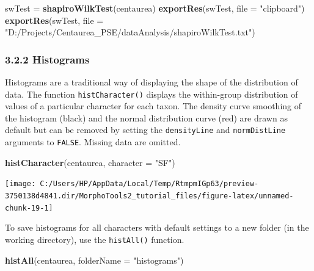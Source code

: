 \documentclass[
]{article}
\newenvironment{Shaded}{\begin{snugshade}}{\end{snugshade}}
\newcommand{\DataTypeTok}[1]{\textcolor[rgb]{0.13,0.29,0.53}{#1}}
\newcommand{\KeywordTok}[1]{\textcolor[rgb]{0.13,0.29,0.53}{\textbf{#1}}}
\newcommand{\NormalTok}[1]{#1}
\newcommand{\StringTok}[1]{\textcolor[rgb]{0.31,0.60,0.02}{#1}}
\begin{document}
\begin{Shaded}
\begin{Highlighting}[]
\NormalTok{swTest =}\StringTok{ }\KeywordTok{shapiroWilkTest}\NormalTok{(centaurea)}
\KeywordTok{exportRes}\NormalTok{(swTest, }\DataTypeTok{file =} \StringTok{"clipboard"}\NormalTok{)}
\KeywordTok{exportRes}\NormalTok{(swTest, }\DataTypeTok{file =} \StringTok{"D:/Projects/Centaurea_PSE/dataAnalysis/shapiroWilkTest.txt"}\NormalTok{)}
\end{Highlighting}
\end{Shaded}

\hypertarget{histograms}{%
\subsubsection{3.2.2 Histograms}\label{histograms}}

Histograms are a traditional way of displaying the shape of the
distribution of data. The function \texttt{histCharacter()} displays the
within-group distribution of values of a particular character for each
taxon. The density curve smoothing of the histogram (black) and the
normal distribution curve (red) are drawn as default but can be removed
by setting the \texttt{densityLine} and \texttt{normDistLine} arguments
to \texttt{FALSE}. Missing data are omitted.

\begin{Shaded}
\begin{Highlighting}[]
\KeywordTok{histCharacter}\NormalTok{(centaurea, }\DataTypeTok{character =} \StringTok{"SF"}\NormalTok{)}
\end{Highlighting}
\end{Shaded}

\begin{center}\texttt{[image: C:/Users/HP/AppData/Local/Temp/RtmpmIGp63/preview-3750138d4841.dir/MorphoTools2\_tutorial\_files/figure-latex/unnamed-chunk-19-1]} \end{center}

To save histograms for all characters with default settings to a new
folder (in the working directory), use the \texttt{histAll()} function.

\begin{Shaded}
\begin{Highlighting}[]
\KeywordTok{histAll}\NormalTok{(centaurea, }\DataTypeTok{folderName =} \StringTok{"histograms"}\NormalTok{)}
\end{Highlighting}
\end{Shaded}
\end{document}
